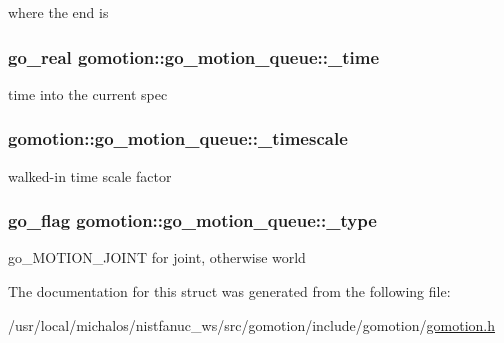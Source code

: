 where the end is \hypertarget{structgomotion_1_1go__motion__queue_a9f72301ca7a9a96fde11f519c097cdaf}{
\subsubsection[{\-\_\-time}]{\setlength{\rightskip}{0pt plus 5cm}go\-\_\-real gomotion\-::go\-\_\-motion\-\_\-queue\-::\-\_\-time\hspace{0.3cm}{\ttfamily [protected]}}}\label{structgomotion_1_1go__motion__queue_a9f72301ca7a9a96fde11f519c097cdaf}
time into the current spec \hypertarget{structgomotion_1_1go__motion__queue_a78ce1642f13b46e810ae781a827408e6}{
\subsubsection[{\-\_\-timescale}]{ gomotion\-::go\-\_\-motion\-\_\-queue\-::\-\_\-timescale\hspace{0.3cm}{\ttfamily [protected]}}}\label{structgomotion_1_1go__motion__queue_a78ce1642f13b46e810ae781a827408e6}
walked-\/in time scale factor \hypertarget{structgomotion_1_1go__motion__queue_a0c5400b47c8a5e5966da98832ddad2dd}{
\subsubsection[{\-\_\-type}]{\setlength{\rightskip}{0pt plus 5cm}go\-\_\-flag gomotion\-::go\-\_\-motion\-\_\-queue\-::\-\_\-type\hspace{0.3cm}{\ttfamily [protected]}}}\label{structgomotion_1_1go__motion__queue_a0c5400b47c8a5e5966da98832ddad2dd}
go\-\_\-\-M\-O\-T\-I\-O\-N\-\_\-\-J\-O\-I\-N\-T for joint, otherwise world 

The documentation for this struct was generated from the following file\-:\begin{DoxyCompactItemize}
\item 
/usr/local/michalos/nistfanuc\-\_\-ws/src/gomotion/include/gomotion/\hyperlink{gomotion_8h}{gomotion.\-h}\end{DoxyCompactItemize}
